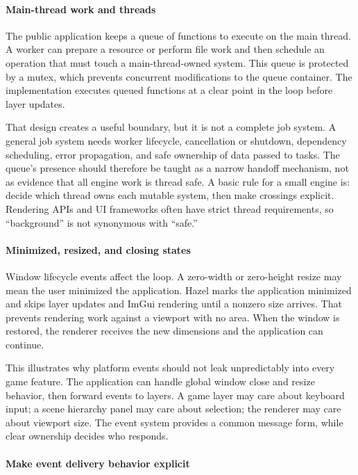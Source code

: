 \paragraph{Main-thread work and threads}\label{main-thread-work-and-threads}

The public application keeps a queue of functions to execute on the main thread. A worker can prepare a resource or perform file work and then schedule an operation that must touch a main-thread-owned system. This queue is protected by a mutex, which prevents concurrent modifications to the queue container. The implementation executes queued functions at a clear point in the loop before layer updates.

That design creates a useful boundary, but it is not a complete job system. A general job system needs worker lifecycle, cancellation or shutdown, dependency scheduling, error propagation, and safe ownership of data passed to tasks. The queue's presence should therefore be taught as a narrow handoff mechanism, not as evidence that all engine work is thread safe. A basic rule for a small engine is: decide which thread owns each mutable system, then make crossings explicit. Rendering APIs and UI frameworks often have strict thread requirements, so ``background'' is not synonymous with ``safe.''

\paragraph{Minimized, resized, and closing states}\label{minimized-resized-and-closing-states}

Window lifecycle events affect the loop. A zero-width or zero-height resize may mean the user minimized the application. Hazel marks the application minimized and skips layer updates and ImGui rendering until a nonzero size arrives. That prevents rendering work against a viewport with no area. When the window is restored, the renderer receives the new dimensions and the application can continue.

This illustrates why platform events should not leak unpredictably into every game feature. The application can handle global window close and resize behavior, then forward events to layers. A game layer may care about keyboard input; a scene hierarchy panel may care about selection; the renderer may care about viewport size. The event system provides a common message form, while clear ownership decides who responds.

\paragraph{Make event delivery behavior explicit}\label{make-event-delivery-behavior-explicit}

